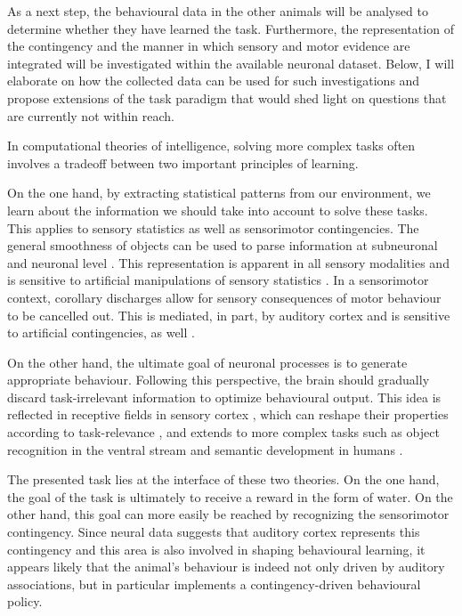 \documentclass[]{report}
\theoremstyle{definition}
\theoremstyle{definition}
\theoremstyle{definition}
\theoremstyle{remark}
\begin{document}
As a next step, the behavioural data in the other animals will be
analysed to determine whether they have learned the task. Furthermore,
the representation of the contingency and the manner in which sensory
and motor evidence are integrated will be investigated within the
available neuronal dataset. Below, I will elaborate on how the collected
data can be used for such investigations and propose extensions of the
task paradigm that would shed light on questions that are currently not
within reach.

In computational theories of intelligence, solving more complex tasks
often involves a tradeoff between two important principles of learning.

On the one hand, by extracting statistical patterns from our
environment, we learn about the information we should take into account
to solve these tasks. This applies to sensory statistics as well as
sensorimotor contingencies. The general smoothness of objects can be
used to parse information at subneuronal \citep{srinivasan1982pc} and
neuronal level \citep{rao1999pc}. This representation is apparent in all
sensory modalities \citep{fox2005comparison, smith2006efficient} and is
sensitive to artificial manipulations of sensory statistics
\citep{wood2016chick, wood2018chick}. In a sensorimotor context,
corollary discharges allow for sensory consequences of motor behaviour
to be cancelled out. This is mediated, in part, by auditory cortex
\citep{schneider2014discharges} and is sensitive to artificial
contingencies, as well \citep{schneider2018cortical}.

On the other hand, the ultimate goal of neuronal processes is to
generate appropriate behaviour. Following this perspective, the brain
should gradually discard task-irrelevant information to optimize
behavioural output. This idea is reflected in receptive fields in
sensory cortex
\citep{hubel1965receptive, hubel1968receptive, aertsen1980receptive, aertsen1981receptive},
which can reshape their properties according to task-relevance
\citep{fritz2003rapid}, and extends to more complex tasks such as object
recognition in the ventral stream \citep{dicarlo2012visual} and semantic
development in humans \citep{saxe2019semantic}.

The presented task lies at the interface of these two theories. On the
one hand, the goal of the task is ultimately to receive a reward in the
form of water. On the other hand, this goal can more easily be reached
by recognizing the sensorimotor contingency. Since neural data suggests
that auditory cortex represents this contingency and this area is also
involved in shaping behavioural learning, it appears likely that the
animal's behaviour is indeed not only driven by auditory associations,
but in particular implements a contingency-driven behavioural policy.
\end{document}
